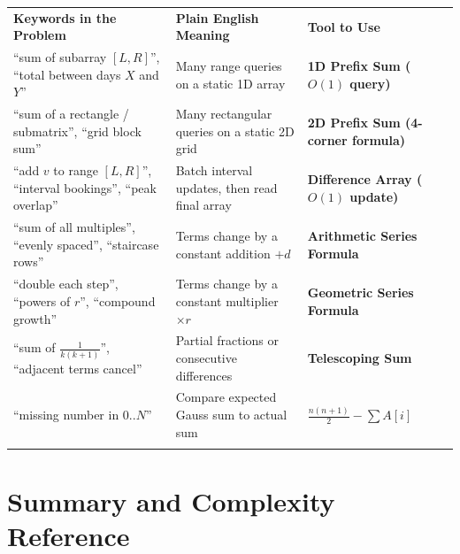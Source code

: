\documentclass[11pt,a4paper]{article}
\theoremstyle{definition}
\begin{document}
\begingroup\small{}
\begin{tabularx}{\textwidth}{>{\raggedright\arraybackslash}p{4.4cm} >{\raggedright\arraybackslash}X >{\raggedright\arraybackslash\bfseries}p{4.1cm}}
\arrayrulecolor{primaryblue}\toprule[1.2pt]
\rowcolor{primaryblue!10}
\textcolor{primaryblue}{\textbf{Keywords in the Problem}} & \textcolor{primaryblue}{\textbf{Plain English Meaning}} & \textcolor{primaryblue}{\textbf{Tool to Use}} \\
\arrayrulecolor{codeframe}\midrule[0.6pt]
``sum of subarray $[L, R]$'', ``total between days $X$ and $Y$'' & Many range queries on a static 1D array & 1D Prefix Sum ($O(1)$ query) \\
``sum of a rectangle / submatrix'', ``grid block sum'' & Many rectangular queries on a static 2D grid & 2D Prefix Sum (4-corner formula) \\
``add $v$ to range $[L, R]$'', ``interval bookings'', ``peak overlap'' & Batch interval updates, then read final array & Difference Array ($O(1)$ update) \\
``sum of all multiples'', ``evenly spaced'', ``staircase rows'' & Terms change by a constant addition $+d$ & Arithmetic Series Formula \\
``double each step'', ``powers of $r$'', ``compound growth'' & Terms change by a constant multiplier $\times r$ & Geometric Series Formula \\
``sum of $\frac{1}{k(k+1)}$'', ``adjacent terms cancel'' & Partial fractions or consecutive differences & Telescoping Sum \\
``missing number in $0..N$'' & Compare expected Gauss sum to actual sum & $\frac{n(n+1)}{2} - \sum A[i]$ \\
\arrayrulecolor{primaryblue}\bottomrule[1.2pt]
\end{tabularx}\endgroup

\section{Summary and Complexity Reference}
\end{document}
